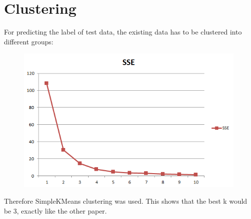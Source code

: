 \section{Clustering}
For predicting the label of test data, the existing data has to be clustered into different groups:
\begin{figure}[H]
	\centering
	\includegraphics[width=\columnwidth]{../../charts/SSE.png}
\end{figure}
Therefore SimpleKMeans clustering was used. This shows that the best k would be 3, exactly like the other paper.